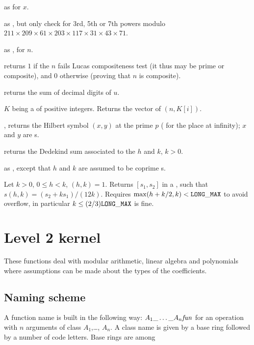  as 
for  $x$.

 as , but
only check for 3rd, 5th or 7th powers modulo
$211\times209\times61\times203\times117\times31\times43\times71$.

 as , for
 $n$.

 returns $1$ if the  $n$ fails Lucas
compositeness test (it thus may be prime or composite), and $0$ otherwise
(proving that $n$ is composite).

 returns the sum of decimal digits of $u$.

 $K$ being a  of
positive integers. Returns the vector of $(n, K[i])$.

, returns the Hilbert symbol
$(x,y)$ at the prime $p$ ( for the place at infinity); $x$ and $y$
are s.

 returns the Dedekind sum associated to
the  $h$ and $k$, $k > 0$.

 as , except
that $h$ and $k$ are assumed to be coprime s.

Let $k > 0$, $0 \leq h < k$, $(h,k) = 1$. Returns $[s_1,s_2]$
in a , such that $s(h,k) = (s_2 + k s_1) / (12k)$.
Requires $\max(h + k/2, k) < {\tt LONG\_MAX}$
to avoid overflow, in particular $k \leq (2/3){\tt LONG\_MAX}$ is fine.

\newpage
\chapter{Level 2 kernel}

These functions deal with modular arithmetic, linear algebra and polynomials
where assumptions can be made about the types of the coefficients.

\section{Naming scheme}\label{se:level2names}
A function name is built in the following way:
$A_1{\tt \_}\dots{\tt \_}A_n\hbox{\it fun\/}$ for an operation  with $n$
arguments of class $A_1$,\dots, $A_n$. A class name is given by a base ring
followed by a number of code letters. Base rings are among


